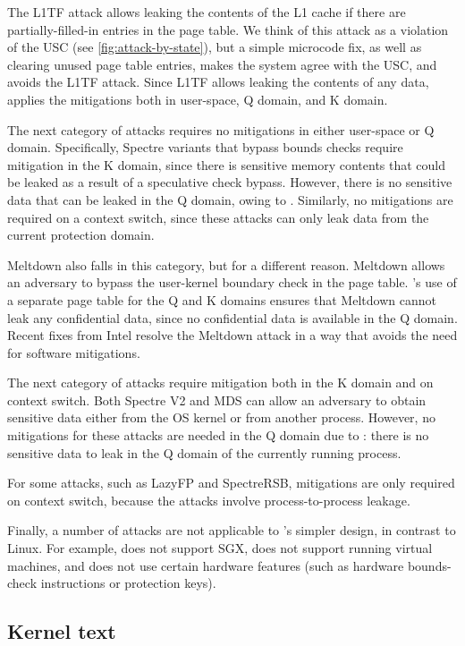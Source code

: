 The L1TF attack allows leaking the contents of the L1 cache if
there are partially-filled-in entries in the page table.  We think of
this attack as a violation of the USC (see \autoref{fig:attack-by-state}),
but a simple microcode fix, as well as clearing unused page table entries,
makes the system agree with the USC, and avoids the L1TF attack.  Since
L1TF allows leaking the contents of any data, \sys applies the mitigations
both in user-space, Q domain, and K domain.

The next category of attacks requires no mitigations in either user-space
or Q domain.  Specifically, Spectre variants that bypass bounds checks
require mitigation in the K domain, since there is sensitive memory
contents that could be leaked as a result of a speculative check bypass.
However, there is no sensitive data that can be leaked in the Q domain,
owing to \contract{}.  Similarly, no mitigations are required on a
context switch, since these attacks can only leak data from the current
protection domain.

Meltdown also falls in this category, but for a different reason.
Meltdown allows an adversary to bypass the user-kernel boundary check
in the page table.  \sys's use of a separate page table for the Q and
K domains ensures that Meltdown cannot leak any confidential data, since
no confidential data is available in the Q domain.  Recent fixes from Intel resolve the Meltdown attack in a way that avoids the need for
software mitigations.

The next category of attacks require mitigation both in the K domain and
on context switch. Both Spectre V2 and MDS can allow an adversary to
obtain sensitive data either from the OS kernel or from another process.
However, no mitigations for these attacks are needed in the Q domain
due to \contract{}: there is no sensitive data to leak in the Q domain
of the currently running process.

For some attacks, such as LazyFP and SpectreRSB, mitigations are only
required on context switch, because the attacks involve process-to-process
leakage.

Finally, a number of attacks are not applicable to \sys's simpler design,
in contrast to Linux.  For example, \sys does not support SGX, does
not support running virtual machines, and does not use certain hardware
features (such as hardware bounds-check instructions or protection keys).


\subsection{Kernel text}
\label{ss:ktext}

